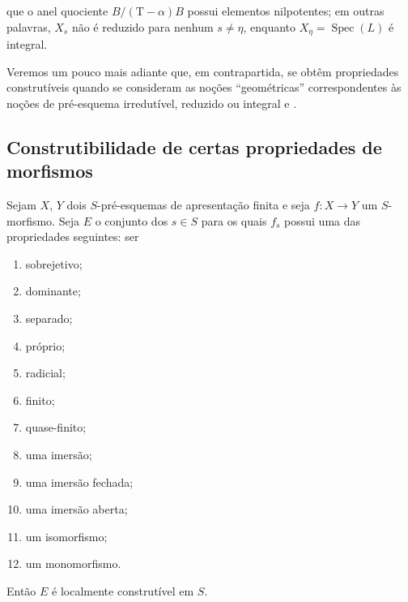 \begin{remark}[9.5.7]

que o anel quociente $B/(\mathrm{T}-\alpha)B$ possui elementos nilpotentes; em outras palavras, $X_s$ não é reduzido para nenhum $s\neq\eta$, enquanto $X_\eta=\operatorname{Spec}(L)$ é integral.

Veremos um pouco mais adiante  que, em contrapartida, se obtêm propriedades construtíveis quando se consideram as noções ``geométricas'' correspondentes às noções de pré-esquema irredutível, reduzido ou integral  e .
\end{remark}

\subsection{Construtibilidade de certas propriedades de morfismos}
\label{subsection:IV.9.6}

\begin{proposition}[9.6.1]
\label{IV.9.6.1}
Sejam $X$, $Y$ dois $S$-pré-esquemas de apresentação finita e seja $f:X\to Y$ um $S$-morfismo.
Seja $E$ o conjunto dos $s\in S$ para os quais $f_s$ possui uma das propriedades seguintes: ser
\begin{enumerate}[label=(\roman*),widest=xii]
  \item sobrejetivo;
  \item dominante;
  \item separado;
  \item próprio;
  \item radicial;
  \item finito;
  \item quase-finito;
  \item uma imersão;
  \item uma imersão fechada;
  \item uma imersão aberta;
  \item um isomorfismo;
  \item um monomorfismo.
\end{enumerate}
Então $E$ é localmente construtível em $S$.
\end{proposition}

